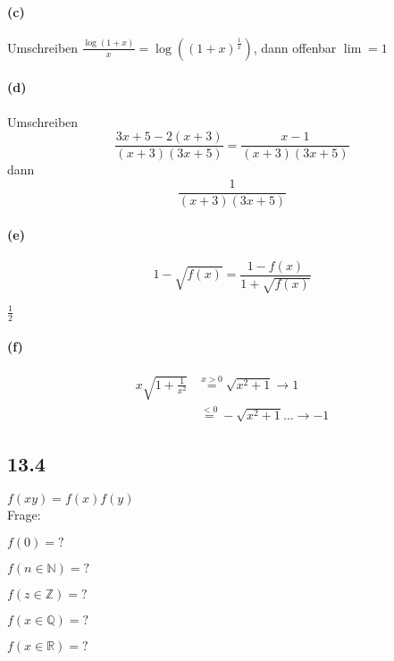 \paragraph{(c)}

Umschreiben $\frac{\log(1+x)}{x}=\log((1+x)^\frac{1}{x})$, dann offenbar $\lim=1$

\paragraph{(d)}

Umschreiben
\begin{equation*}
\frac{3x+5-2(x+3)}{(x+3)(3x+5)}=\frac{x-1}{(x+3)(3x+5)}
\end{equation*}
dann
\begin{equation*}
\frac{1}{(x+3)(3x+5)}
\end{equation*}

\paragraph{(e)}

\begin{equation*}
1-\sqrt{f(x)}=\frac{1-f(x)}{1+\sqrt{f(x)}}
\end{equation*}

$\frac{1}{2}$

\paragraph{(f)}

\begin{align*}
x\sqrt{1+\frac{1}{x^2}}&\overset{x>0}{=}\sqrt{x^2+1}\rightarrow1\\
&\overset{<0}{=}-\sqrt{x^2+1}...\rightarrow -1
\end{align*}

\newpage

\subsection{13.4}

$f(xy)=f(x)f(y)$\\

Frage:

$f(0)=?$

$f(n\in\mathbb{N})=?$

$f(z\in\mathbb{Z})=?$

$f(x\in\mathbb{Q})=?$

$f(x\in\mathbb{R})=?$\\

